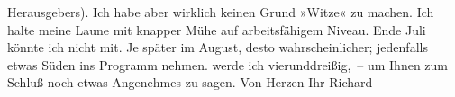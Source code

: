                Herausgebers). Ich habe aber wirklich keinen Grund »Witze« zu machen. Ich halte meine
               Laune mit knapper Mühe auf arbeits{\pb}fähigem Niveau. Ende Juli könnte ich nicht mit. Je später im August,
               desto wahrscheinlicher; jedenfalls etwas Süden ins Programm nehmen. \label{K_L01046-1v}\label{K_L01046-1} werde ich vierunddreißig, – um Ihnen zum Schluß noch etwas
               Angenehmes zu sagen.\pend
           \pstart Von Herzen Ihr \spacefill\mbox{Richard}\pend{}\endnumbering{}  
      